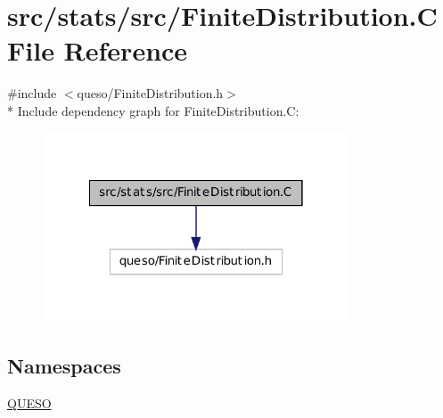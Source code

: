 \hypertarget{_finite_distribution_8_c}{\section{src/stats/src/\-Finite\-Distribution.C File Reference}
\label{_finite_distribution_8_c}
}
{\ttfamily \#include $<$queso/\-Finite\-Distribution.\-h$>$}\\*
Include dependency graph for Finite\-Distribution.\-C\-:
\nopagebreak
\begin{figure}[H]
\begin{center}
\leavevmode
\includegraphics[width=258pt]{_finite_distribution_8_c__incl}
\end{center}
\end{figure}
\subsection*{Namespaces}
\begin{DoxyCompactItemize}
\item 
\hyperlink{namespace_q_u_e_s_o}{Q\-U\-E\-S\-O}
\end{DoxyCompactItemize}
